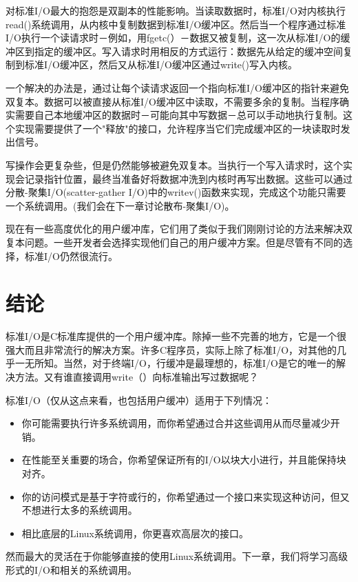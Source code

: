 对标准I/O最大的抱怨是双副本的性能影响。当读取数据时，标准I/O对内核执行read()系统调用，从内核中复制数据到标准I/O缓冲区。然后当一个程序通过标准I/O执行一个读请求时－例如，用fgetc(）－数据又被复制，这一次从标准I/O的缓冲区到指定的缓冲区。写入请求时用相反的方式运行：数据先从给定的缓冲空间复制到标准I/O缓冲区，然后又从标准I/O缓冲区通过write()写入内核。

一个解决的办法是，通过让每个读请求返回一个指向标准I/O缓冲区的指针来避免双复本。数据可以被直接从标准I/O缓冲区中读取，不需要多余的复制。当程序确实需要自己本地缓冲区的数据时－可能向其中写数据－总可以手动地执行复制。这个实现需要提供了一个"释放"的接口，允许程序当它们完成缓冲区的一块读取时发出信号。

写操作会更复杂些，但是仍然能够被避免双复本。当执行一个写入请求时，这个实现会记录指针位置，最终当准备好将数据冲洗到内核时再写出数据。这些可以通过分散-聚集I/O(scatter-gather I/O)中的writev()函数来实现，完成这个功能只需要一个系统调用。(我们会在下一章讨论散布-聚集I/O)。

现在有一些高度优化的用户缓冲库，它们用了类似于我们刚刚讨论的方法来解决双复本问题。一些开发者会选择实现他们自己的用户缓冲方案。但是尽管有不同的选择，标准I/O仍然很流行。

\section{结论}

标准I/O是C标准库提供的一个用户缓冲库。除掉一些不完善的地方，它是一个很强大而且非常流行的解决方案。许多C程序员，实际上除了标准I/O，对其他的几乎一无所知。当然，对于终端I/O，行缓冲是最理想的，标准I/O是它的唯一的解决方法。又有谁直接调用write（）向标准输出写过数据呢？

标准I/O（仅从这点来看，也包括用户缓冲）适用于下列情况：

\begin{itemize}
\item 你可能需要执行许多系统调用，而你希望通过合并这些调用从而尽量减少开销。
\item 在性能至关重要的场合，你希望保证所有的I/O以块大小进行，并且能保持块对齐。
\item 你的访问模式是基于字符或行的，你希望通过一个接口来实现这种访问，但又不想进行太多的系统调用。
\item 相比底层的Linux系统调用，你更喜欢高层次的接口。
\end{itemize}

然而最大的灵活在于你能够直接的使用Linux系统调用。下一章，我们将学习高级形式的I/O和相关的系统调用。 
